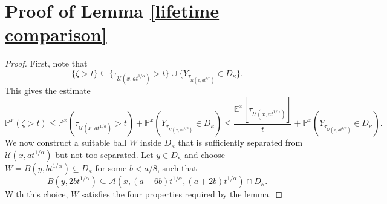 \documentclass[12pt,a4paper]{amsart}
\numberwithin{equation}{section}
\theoremstyle{plain}
\newcommand{\mc}{\mathcal}
\newcommand{\mb}{\mathbb}
\newcommand{\1}{\mathbbm{1}}
\begin{document}
\section{Proof of Lemma \ref{lifetime comparison}} \label{app:proof of lifetime}
\begin{proof} 
First, note that 
\[
\{\zeta > t\} \subseteq \{\tau_{\mc U(x,at^{1/\alpha})}>t\} \cup 
\{Y_{\tau_{\mc U(x,at^{1/\alpha})}} \in D_\kappa\}.
\]
This gives the estimate
$$
\mb{P}^x(\zeta > t) \le \mb{P}^x(\tau_{\mc U(x,at^{1/\alpha})}>t) + 
\mb{P}^x(Y_{\tau_{\mc U(x,at^{1/\alpha})}} \in D_\kappa) 
\le \frac{\mb E^x[\tau_{\mc U(x,at^{1/\alpha})}]}{t} + 
\mb{P}^x(Y_{\tau_{\mc U(x,at^{1/\alpha})}} \in D_\kappa).
$$
We now construct a suitable ball $W$ inside 
$D_\kappa$ that is sufficiently separated from $\mc U(x,at^{1/\alpha})$ 
but not too separated. Let $y\in D_\kappa$ and choose 
$W = B(y,b t^{1/\alpha}) \subseteq D_\kappa$ 
for some $b<a/8$, such that 
\begin{equation}\label{choose W: far}
B(y,2b t^{1/\alpha}) \subseteq \mc A(x,(a+6b)t^{1/\alpha}, (a+2b)t^{1/\alpha})\cap D_\kappa.
\end{equation}
With this choice, $W$ satisfies the four properties required by the lemma.


\end{proof}
\end{document}
